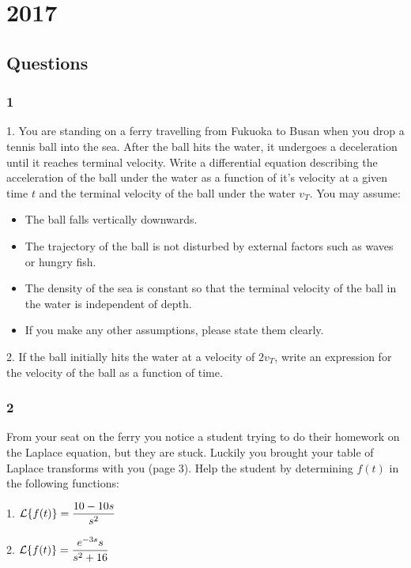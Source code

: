 \section{2017}
\subsection{Questions}




\subsubsection{1}

1. You are standing on a ferry travelling from Fukuoka to Busan when you drop a tennis ball into the sea. After the ball hits the water, it undergoes a deceleration until it reaches terminal velocity. Write a differential equation describing the acceleration of the ball under the water as a function of it's velocity at a given time $t$ and the terminal velocity of the ball under the water $v_T$. You may assume:
\begin{itemize}
    \item The ball falls vertically downwards.
    \item The trajectory of the ball is not disturbed by external factors such as waves or hungry fish.
    \item The density of the sea is constant so that the terminal velocity of the ball in the water is independent of depth.
    \item If you make any other assumptions, please state them clearly.
\end{itemize}

2. If the ball initially hits the water at a velocity of $2 v_T$, write an expression for the velocity of the ball as a function of time.




\subsubsection{2}

From your seat on the ferry you notice a student trying to do their homework on the Laplace equation, but they are stuck. Luckily you brought your table of Laplace transforms with you (page 3). Help the student by determining $f(t)$ in the following functions:

1. $\displaystyle \mathcal{L}\{f(t)\} = \frac{10-10s}{s^2}$

2. $\displaystyle \mathcal{L}\{f(t)\} = \frac{e^{-3s} s}{s^2+16}$




